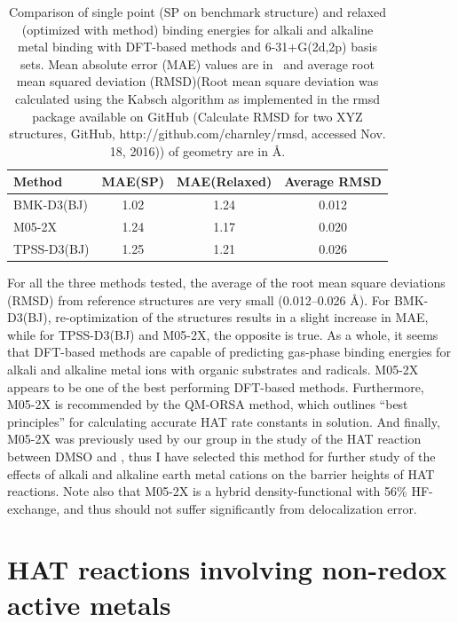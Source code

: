 \begin{table}
  \caption[Comparison of single point and relaxed binding energies for alkali
  and alkaline metal binding with DFT-based methods.]{Comparison of single point
  (SP on benchmark structure) and relaxed (optimized with method) binding
  energies for alkali and alkaline metal binding with DFT-based methods and
  6-31+G(2d,2p) basis sets. Mean absolute error (MAE) values are in \kcalmol\
  and average root mean squared deviation (RMSD)(Root mean square deviation was
  calculated using the Kabsch algorithm\protect\cite{Kabsch1976} as implemented
  in the rmsd package available on GitHub (Calculate RMSD for two XYZ
  structures, GitHub, http://github.com/charnley/rmsd, accessed Nov. 18, 2016))
  of geometry are in \AA.}
  \label{tab:ccsd-metal-opt}
  \begin{tabular}{l c c c}
    Method & MAE(SP) & MAE(Relaxed) & Average RMSD \\
    \hline
    BMK-D3(BJ) & 1.02 & 1.24 & 0.012 \\
    M05-2X & 1.24 & 1.17 & 0.020 \\
    TPSS-D3(BJ) & 1.25 & 1.21 & 0.026 \\
  \end{tabular}
\end{table}

For all the three methods tested, the average of the root mean square deviations
(RMSD) from reference structures are very small (0.012--0.026 \AA). For
BMK-D3(BJ), re-optimization of the structures results in a slight increase in
MAE, while for TPSS-D3(BJ) and M05-2X, the opposite is true. As a whole, it
seems that DFT-based methods are capable of predicting gas-phase binding
energies for alkali and alkaline metal ions with organic substrates and
radicals. M05-2X appears to be one of the best performing DFT-based methods.
Furthermore, M05-2X is recommended by the QM-ORSA\cite{Galano2013} method, which
outlines ``best principles'' for calculating accurate HAT rate constants in
solution. And finally, M05-2X was previously used by our group in the study of
the HAT reaction between DMSO and \bno,\cite{vanSanten2016} thus I have selected
this method for further study of the effects of alkali and alkaline earth metal
cations on the barrier heights of HAT reactions. Note also that M05-2X is a
hybrid density-functional with 56\% HF-exchange, and thus should not suffer
significantly from delocalization error.

\section{HAT reactions involving non-redox active metals}
